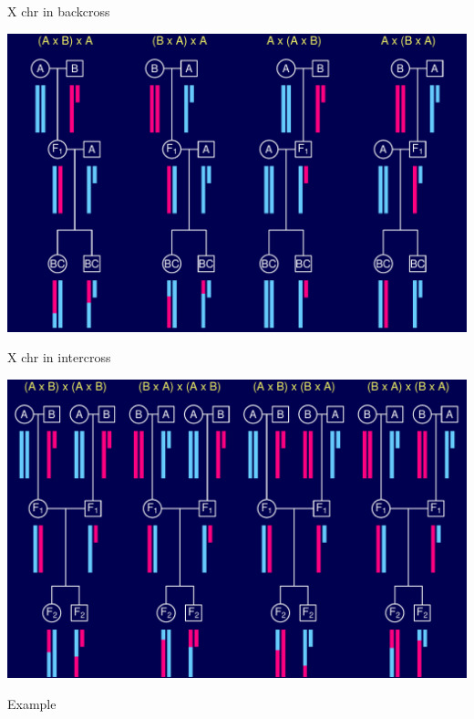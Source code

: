 \documentclass[12pt]{article}
\newcommand{\headsize}{\fontsize{35}{35} \selectfont}
\begin{document}
\newpage

\headsize \color{myyellow}
\hfill \begin{minipage}{5.75in}
\centering
X chr in backcross
\end{minipage}

\vfill

\centerline{\includegraphics[]{FigsA/xchr_bc.pdf}}


\newpage

\headsize \color{myyellow}
\hfill \begin{minipage}{5.75in}
\centering
X chr in intercross
\end{minipage}

\vfill

\centerline{\includegraphics[]{FigsA/xchr_f2.pdf}}




\newpage

\headsize \color{myyellow}
\hfill \begin{minipage}{5.75in}
\centering
Example
\end{minipage}
\end{document}
